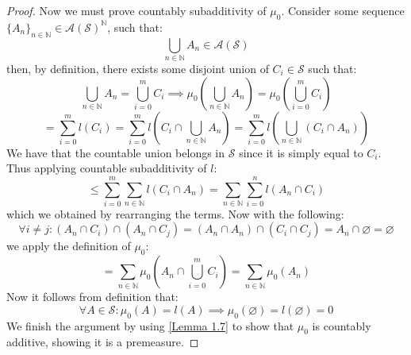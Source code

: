 \documentclass[10pt,letterpaper]{article} %
\begin{document}
\begin{proof}
Now we must prove countably subadditivity of $\mu_0$. Consider some sequence $\{A_n\}_{n \in \mathbb{N}} \in \mathcal{A}(\mathcal{S})^\mathbb{N}$, such that:
\begin{equation*}
\bigcup_{n \in \mathbb{N}}A_n \in \mathcal{A}(\mathcal{S})
\end{equation*}
then, by definition, there exists some disjoint union of $C_i \in \mathcal{S}$ such that:
\begin{equation*}
\bigcup_{n \in \mathbb{N}}A_n = \bigcup_{i=0}^m C_i \implies \mu_0\left(\bigcup_{n \in \mathbb{N}}A_n\right) = \mu_0\left(\bigcup_{i=0}^m C_i\right)
\end{equation*}
\begin{equation*}
= \sum_{i=0}^m l(C_i) = \sum_{i=0}^m l\left(C_i \cap \bigcup_{n \in \mathbb{N}}A_n\right) = \sum_{i=0}^m l\left(\bigcup_{n \in \mathbb{N}}(C_i \cap A_n)\right)
\end{equation*}
We have that the countable union belongs in $\mathcal{S}$ since it is simply equal to $C_i$. Thus applying countable subadditivity of $l$:
\begin{equation*}
\leqslant \sum_{i=0}^m \sum_{n \in \mathbb{N}}l(C_i \cap A_n)  = \sum_{n \in \mathbb{N}}\sum_{i=0}^n l(A_n \cap C_i)
\end{equation*}
which we obtained by rearranging the terms. Now with the following:
\begin{equation*}
\forall i \neq j: (A_n \cap C_i) \cap (A_n \cap C_j) = (A_n \cap A_n) \cap (C_i \cap C_j) = A_n \cap \varnothing = \varnothing
\end{equation*}
we apply the definition of $\mu_0$:
\begin{equation*}
= \sum_{n \in \mathbb{N}}\mu_0\left(A_n \cap \bigcup_{i=0}^m C_i\right) = \sum_{n \in \mathbb{N}}\mu_0(A_n)
\end{equation*}
Now it follows from definition that:
\begin{equation*}
\forall A \in \mathcal{S}: \mu_0(A) = l(A) \implies \mu_0(\varnothing) = l(\varnothing) = 0
\end{equation*}
We finish the argument by using \cref{Lemma 1.7} to show that $\mu_0$ is countably additive, showing it is a premeasure.
\end{proof}
\end{document}
